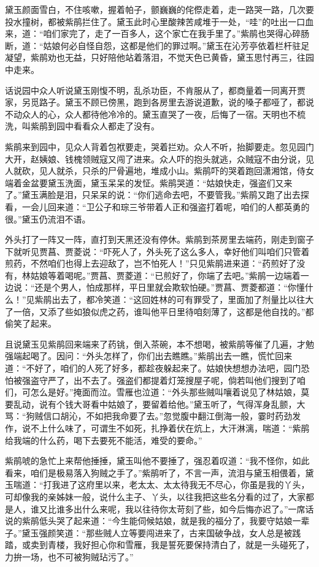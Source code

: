 \documentclass[12pt,oneside]{book}
\begin{document}
黛玉颜面雪白，不住咳嗽，握着帕子，颤巍巍的侘傺走着，走一路哭一路，几次要投水撞树，都被紫鹃拦住了。黛玉此时心里酸辣苦咸堆于一处，“哇”的吐出一口血来，道：“咱们家完了，走了一百多人，这个家亡在我手里了。”紫鹃也哭得心碎肠断，道：“姑娘何必自怪自怨，这都是他们的罪过啊。”黛玉在沁芳亭依着栏杆驻足凝望，紫鹃劝也无益，只好陪他站着落泪，不觉天色已黄昏，黛玉思忖再三，往园中走来。

话说园中众人听说黛玉刚愎不明，乱杀功臣，不肯服从了，都商量着一同离开贾家，另觅路子。黛玉不顾已傍黑，跑到各房里去游说道歉，说的嗓子都哑了，都说不动众人的心，众人都待他冷冷的。黛玉直哭了一夜，后悔了一宿。天明也不梳洗，叫紫鹃到园中看看众人都走了没有。

紫鹃来到园中，见众人背着包袱要走，哭着拦劝。众人不听，抬脚要走。忽见园门大开，赵姨娘、钱槐领贼寇又闯了进来。众人吓的抱头就逃，众贼寇不由分说，见人就砍，见人就杀，只杀的尸骨遍地，堆成小山。紫鹃吓的哭着跑回潇湘馆，侍女端着金盆要黛玉洗面，黛玉呆呆的发怔。紫鹃哭道：“姑娘快走，强盗们又来了。”黛玉满脸是泪，只呆呆的说：“你们逃命去吧，不要管我。”紫鹃又跑了出去探看，一会儿回来道：“卫公子和琮三爷带着人正和强盗打着呢，咱们的人都英勇的很。”黛玉仍流泪不语。

外头打了一阵又一阵，直打到天黑还没有停休。紫鹃到茶房里去端药，刚走到窗子下就听见贾菖、贾菱说：“吓死人了，外头死了这么多人，幸好他们叫咱们只管着煎药，不然咱们也得上去迎敌了，岂不怕死人！”只见紫鹃进来道：“药煎好了没有，林姑娘等着喝呢。”贾菖、贾菱道：“已煎好了，你端了去吧。”紫鹃一边端着一边说：“还是个男人，怕成那样，平日里就会欺软怕硬。”贾菖、贾菱都道：“你懂什么！”见紫鹃出去了，都冷笑道：“这回姓林的可有罪受了，里面加了剂量比以往大了一倍，又添了些如狼似虎之药，谁叫他平日里待咱刻薄了，这都是他自找的。”都偷笑了起来。

且说黛玉见紫鹃回来端来了药铫，倒入茶碗，本不想喝，被紫鹃等催了几遍，才勉强端起喝了。因问：“外头怎样了，你们出去瞧瞧。”紫鹃出去一瞧，慌忙回来道：“不好了，咱们的人死了好多，都趁夜躲起来了。姑娘快想想办法吧，园门恐怕被强盗守严了，出不去了。强盗们都提着灯笼搜屋子呢，倘若叫他们搜到了咱们，可怎么是好。”掩面而泣。雪雁也泣道：“外头那些贼叫嚷着说见了林姑娘，莫要乱动，说有个钱大哥看中姑娘了，要留着给他。”黛玉听了，气得浑身乱颤，大骂：“狗贼信口胡沁，不如把我命要了去。”忽觉腹中翻江倒海一般，霎时药劲发作，说不上什么味了，可谓生不如死，扎挣着伏在炕上，大汗淋漓，喘道：“紫鹃给我端的什么药，喝下去要死不能活，难受的要命。”

紫鹃唬的急忙上来帮他捶捶，黛玉叫他不要捶了，强忍着叹道：“我不怪你，如此看来，咱们是极易落入狗贼之手了。”紫鹃听了，不言一声，流泪与黛玉相偎着，黛玉喘道：“打我进了这府里以来，老太太、太太待我无不尽心，你虽是我的丫头，可却像我的亲姊妹一般，说什么主子、丫头，以往我把这些名分看的过了，大家都是人，谁又比谁多出什么来呢，我以往待你太苛刻了些，如今后悔亦迟了。”一席话说的紫鹃低头哭了起来道：“今生能伺候姑娘，就是我的福分了，我要守姑娘一辈子。”黛玉强颜笑道：“那些贼人立等要闯进来了，古来国破争战，女人总是被践踏，或卖到青楼，我好担心你和雪雁，我是誓死要保持清白了，就是一头碰死了，力拚一场，也不可被狗贼玷污了。”
\end{document}
